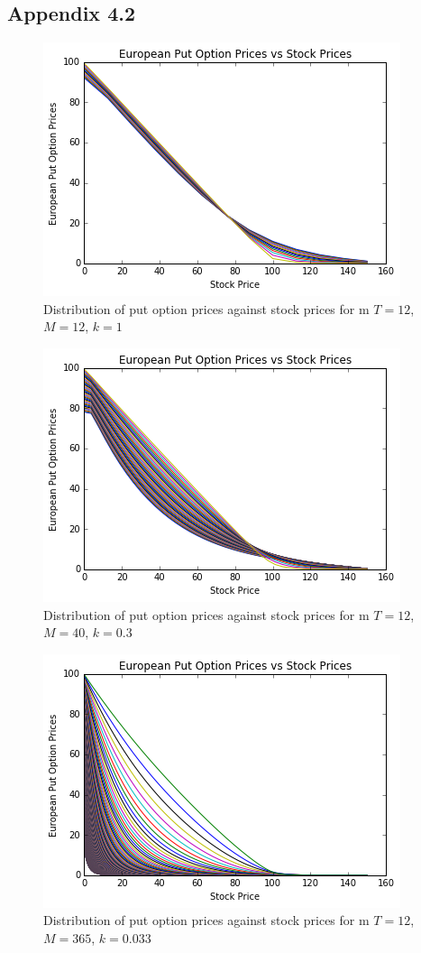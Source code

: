 \documentclass[paper=a4, fontsize=10pt]{article} %
\begin{document}
\subsection*{Appendix 4.2}

\begin{figure}[h!]
\center
\includegraphics[scale=0.8]{vary1212.png}
\caption{Distribution of put option prices against stock prices for m $T=12$, $M=12$, $k=1$}
\end{figure}

\begin{figure}[h!]
\center
\includegraphics[scale=0.8]{vary1240.png}
\caption{Distribution of put option prices against stock prices for m $T=12$, $M=40$, $k=0.3$}
\end{figure}

\begin{figure}[h!]
\center
\includegraphics[scale=0.8]{vary12365.png}
\caption{Distribution of put option prices against stock prices for m $T=12$, $M=365$, $k=0.033$}
\end{figure}
\end{document}
